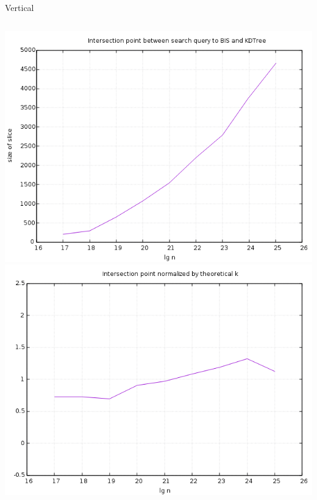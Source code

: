 \documentclass[pdf]{beamer}
\begin{document}
\begin{frame}{Vertical}
  \begin{columns}
    \includegraphics[scale=0.3]{pictures/analysis/vert.png}
    \includegraphics[scale=0.3]{pictures/analysis/vert_theory.png}
  \end{columns}
\end{frame}
\end{document}
